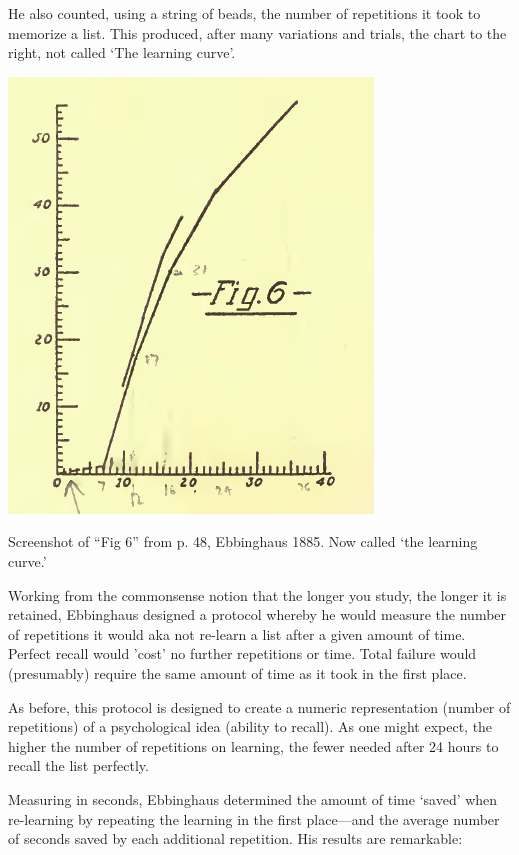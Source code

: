 \begin{refsection}
He also counted, using a string of beads, the number of repetitions it took to memorize a list. This produced, after many variations and trials, the chart to the right, not called ‘The learning curve’.
\begin{marginfigure}
 \begin{center}

     \includegraphics[scale=0.5]{../images/ebbinghausFig6.png}
\end{center}
 \caption{Screenshot of “Fig 6” from p. 48, Ebbinghaus 1885. Now called ‘the learning curve.’}
\label{fig: ebbinghaus6}
\end{marginfigure}


 Working from the commonsense notion that the longer you study, the longer it is retained, Ebbinghaus designed a protocol whereby he would measure the number of repetitions it would aka not re-learn a list after a given amount of time. Perfect recall would ’cost’ no further repetitions or time. Total failure would (presumably) require the same amount of time as it took in the first place.

As before, this protocol is designed to create a numeric representation (number of repetitions) of a psychological idea (ability to recall). As one might expect, the higher the number of repetitions on learning, the fewer needed after 24 hours to recall the list perfectly.

Measuring in seconds, Ebbinghaus determined the amount of time ‘saved’ when re-learning by repeating the learning in the first place---and the average number of seconds saved by each additional repetition. His results are remarkable:
\begin{marginfigure}
 \begin{center}


\end{center}
\end{marginfigure}
\end{refsection}
